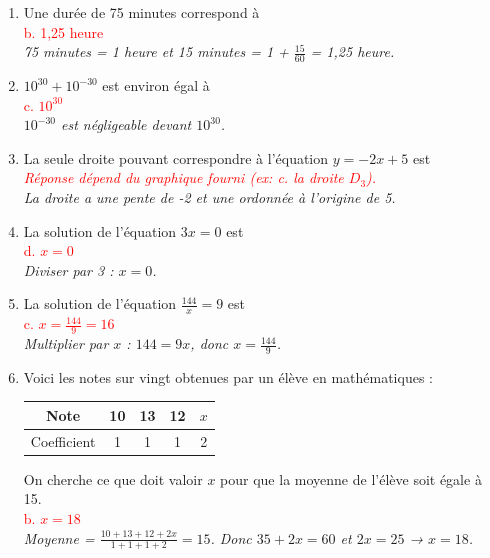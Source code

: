 \documentclass[11pt,a4paper]{article}
\newcommand{\reponse}[1]{\textcolor{red}{#1}}
\begin{document}
\begin{enumerate}
    \item Une durée de 75 minutes correspond à \\
    \reponse{b. 1,25 heure} \\
    \textit{75 minutes = 1 heure et 15 minutes = 1 + $\frac{15}{60}$ = 1,25 heure.}

    \item $10^{30} + 10^{-30}$ est environ égal à \\
    \reponse{c. $10^{30}$} \\
    \textit{$10^{-30}$ est négligeable devant $10^{30}$.}

    \item La seule droite pouvant correspondre à l'équation $y = -2x + 5$ est \\
    \reponse{\textit{Réponse dépend du graphique fourni (ex: c. la droite $D_3$).}} \\
    \textit{La droite a une pente de -2 et une ordonnée à l'origine de 5.}

    \item La solution de l'équation $3x = 0$ est \\
    \reponse{d. $x = 0$} \\
    \textit{Diviser par 3 : $x = 0$.}

    \item La solution de l'équation $\frac{144}{x} = 9$ est \\
    \reponse{c. $x = \frac{144}{9} = 16$} \\
    \textit{Multiplier par $x$ : $144 = 9x$, donc $x = \frac{144}{9}$.}

    \item Voici les notes sur vingt obtenues par un élève en mathématiques :

    \begin{center}
    \begin{tabular}{|c|c|c|c|c|}
        \hline
        Note & 10 & 13 & 12 & $x$ \\
        \hline
        Coefficient & 1 & 1 & 1 & 2 \\
        \hline
    \end{tabular}
    \end{center}

    On cherche ce que doit valoir $x$ pour que la moyenne de l'élève soit égale à 15. \\
    \reponse{b. $x = 18$} \\
    \textit{Moyenne = $\frac{10 + 13 + 12 + 2x}{1 + 1 + 1 + 2} = 15$. Donc $35 + 2x = 60$ et $2x = 25$ → $x = 18$.}
\end{enumerate}
\end{document}
